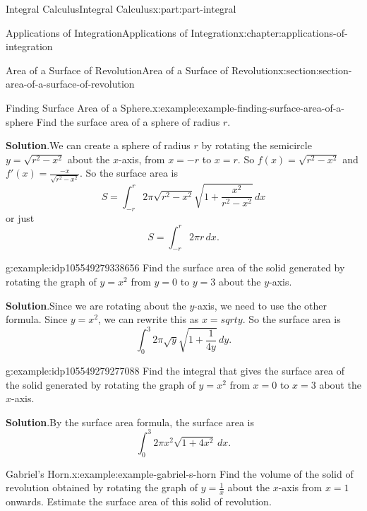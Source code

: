 \documentclass[twoside,10pt,]{book}
\newcommand{\blocktitlefont}{\relax}
\numberwithin{equation}{part}
\begin{document}
\begin{partptx}{Integral Calculus}{}{Integral Calculus}{}{}{x:part:part-integral}
\begin{chapterptx}{Applications of Integration}{}{Applications of Integration}{}{}{x:chapter:applications-of-integration}
\begin{sectionptx}{Area of a Surface of Revolution}{}{Area of a Surface of Revolution}{}{}{x:section:section-area-of-a-surface-of-revolution}
\begin{equation*}
\end{equation*}
%
\begin{example}{Finding Surface Area of a Sphere.}{x:example:example-finding-surface-area-of-a-sphere}%
Find the surface area of a sphere of radius \(r\).%
\par\smallskip%
\noindent\textbf{\blocktitlefont Solution}.\hypertarget{g:solution:idp105549279334816}{}\quad{}We can create a sphere of radius \(r\) by rotating the semicircle \(y=\sqrt{r^{2}-x^{2}}\) about the \(x\)-axis, from \(x=-r\) to \(x=r\). So \(f(x)=\sqrt{r^{2}-x^{2}}\) and \(f'(x)=\displaystyle\frac{-x}{\sqrt{r^{2}-x^{2}}}\). So the surface area is%
\begin{equation*}
S=\int_{-r}^{r}2\pi\sqrt{r^{2}-x^{2}}\sqrt{1+\frac{x^{2}}{r^{2}-x^{2}}}\,dx
\end{equation*}
or just%
\begin{equation*}
S=\int_{-r}^{r}2\pi r \, dx.
\end{equation*}
%
\end{example}
\begin{example}{}{g:example:idp105549279338656}%
Find the surface area of the solid generated by rotating the graph of \(y=x^{2}\) from \(y=0\) to \(y=3\) about the \(y\)-axis.%
\par\smallskip%
\noindent\textbf{\blocktitlefont Solution}.\hypertarget{g:solution:idp105549279275168}{}\quad{}Since we are rotating about the \(y\)-axis, we need to use the other formula. Since \(y=x^{2}\), we can rewrite this as \(x=sqrt{y}\). So the surface area is%
\begin{equation*}
\int_{0}^{3}2\pi\sqrt{y}\sqrt{1+\frac{1}{4y}}\,dy.
\end{equation*}
%
\end{example}
\begin{example}{}{g:example:idp105549279277088}%
Find the integral that gives the surface area of the solid generated by rotating the graph of \(y=x^{2}\) from \(x=0\) to \(x=3\) about the \(x\)-axis.%
\par\smallskip%
\noindent\textbf{\blocktitlefont Solution}.\hypertarget{g:solution:idp105549279279136}{}\quad{}By the surface area formula, the surface area is%
\begin{equation*}
\int_{0}^{3}2 \pi x^{2} \sqrt{1+4x^{2}}\,dx.
\end{equation*}
%
\end{example}
\begin{example}{Gabriel's Horn.}{x:example:example-gabriel-s-horn}%
Find the volume of the solid of revolution obtained by rotating the graph of \(y = \frac{1}{x}\) about the \(x\)-axis from \(x = 1\) onwards. Estimate the surface area of this solid of revolution.%

\end{example}
\end{sectionptx}
\end{chapterptx}
\end{partptx}
\end{document}
